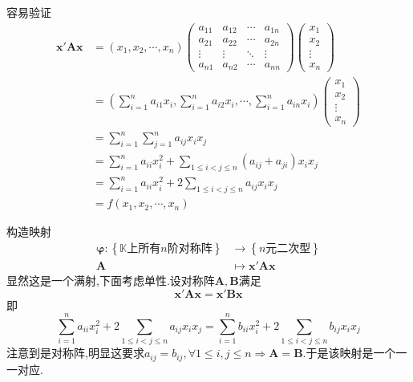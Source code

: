容易验证\begin{align*}
    \bm{x}'\bm{Ax}&=\left(
        x_1,x_2,\cdots,x_n
    \right)\begin{pmatrix}
        a_{11}&a_{12}&\cdots&a_{1n}\\
        a_{21}&a_{22}&\cdots&a_{2n}\\
        \vdots&\vdots&\ddots&\vdots\\
        a_{n1}&a_{n2}&\cdots&a_{nn}
    \end{pmatrix}\begin{pmatrix}
        x_1\\x_2\\\vdots\\x_n
    \end{pmatrix}\\
    &=\left(
        \sum_{i=1}^{n}a_{i1}x_i,\sum_{i=1}^{n}a_{i2}x_i,\cdots,\sum_{i=1}^{n}a_{in}x_i
    \right)\begin{pmatrix}
        x_1\\x_2\\\vdots\\x_n
    \end{pmatrix}\\
    &=\sum_{i=1}^{n}\sum_{j=1}^{n}a_{ij}x_ix_j\\
    &=\sum_{i=1}^{n}a_{ii}x_i^2+\sum_{1\leqslant i<j\leqslant n}\left(
        a_{ij}+a_{ji}
    \right)x_ix_j\\
    &=\sum_{i=1}^{n}a_{ii}x_i^2+2\sum_{1\leqslant i<j\leqslant n}a_{ij}x_ix_j\\
    &=f\left(
        x_1,x_2,\cdots,x_n
    \right)
\end{align*}

构造映射\begin{align*}
    \bm{\varphi}:\left\{
        \mathbb{K}\text{上所有}n\text{阶对称阵}
    \right\}&\longrightarrow\left\{
        n\text{元二次型}
    \right\}\\
    \bm{A}&\longmapsto\bm{x}'\bm{Ax}
\end{align*}
显然这是一个满射,下面考虑单性.设对称阵$\bm{A},\bm{B}$满足\[
\bm{x}'\bm{Ax}=\bm{x}'\bm{Bx}
\]即\[
\sum_{i=1}^{n}a_{ii}x_i^2+2\sum_{1\leqslant i<j\leqslant n}a_{ij}x_ix_j=\sum_{i=1}^{n}b_{ii}x_i^2+2\sum_{1\leqslant i<j\leqslant n}b_{ij}x_ix_j
\]注意到是对称阵,明显这要求$a_{ij}=b_{ij},\forall 1\leqslant i,j\leqslant n\Longrightarrow \bm{A}=\bm{B}.$于是该映射是一个一一对应.

